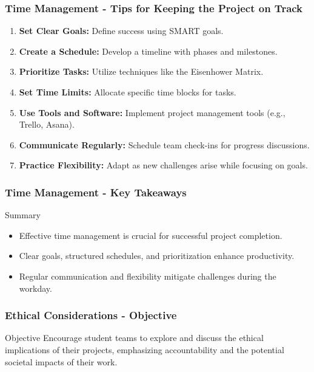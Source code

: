 \documentclass{beamer}
\begin{document}
\begin{frame}[fragile]
    \frametitle{Time Management - Tips for Keeping the Project on Track}
    \begin{enumerate}
        \item \textbf{Set Clear Goals:} Define success using SMART goals.
        \item \textbf{Create a Schedule:} Develop a timeline with phases and milestones.
        \item \textbf{Prioritize Tasks:} Utilize techniques like the Eisenhower Matrix.
        \item \textbf{Set Time Limits:} Allocate specific time blocks for tasks.
        \item \textbf{Use Tools and Software:} Implement project management tools (e.g., Trello, Asana).
        \item \textbf{Communicate Regularly:} Schedule team check-ins for progress discussions.
        \item \textbf{Practice Flexibility:} Adapt as new challenges arise while focusing on goals.
    \end{enumerate}
\end{frame}

\begin{frame}[fragile]
    \frametitle{Time Management - Key Takeaways}
    \begin{block}{Summary}
        \begin{itemize}
            \item Effective time management is crucial for successful project completion.
            \item Clear goals, structured schedules, and prioritization enhance productivity.
            \item Regular communication and flexibility mitigate challenges during the workday.
        \end{itemize}
    \end{block}
\end{frame}

\begin{frame}[fragile]
    \frametitle{Ethical Considerations - Objective}
    \begin{block}{Objective}
        Encourage student teams to explore and discuss the ethical implications of their projects, emphasizing accountability and the potential societal impacts of their work.
    \end{block}
\end{frame}
\end{document}
